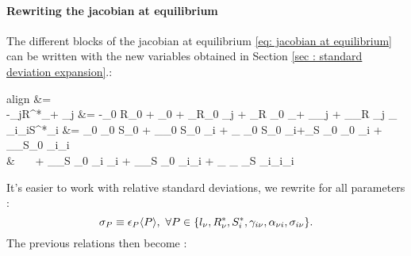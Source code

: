 \documentclass[12pt, titlepage, twoside, openright]{report}
\begin{document}
	 \paragraph{Rewriting the jacobian at equilibrium}
	 The different blocks of the jacobian at equilibrium \eqref{eq: jacobian at equilibrium} can be written with the new variables obtained in Section \ref{sec : standard deviation expansion}.:
	 \begin{empheq}[left=\empheqlbrace]{align}
	  &=  \\
	 -\gamma_{j\mu}R^*_\mu + \alpha_{\mu j} &= -\gamma_0 R_0 + \alpha_0 + \sigma_\gamma R_0 \tilde{\gamma}_{j\mu} + \sigma_R \gamma_0 _\mu + \sigma_\alpha \tilde{\alpha}_{\mu j} + \sigma_\gamma \sigma_R \tilde{\gamma}_{j\mu} _\mu \\
	 \sigma_{i\nu}\gamma_{i\nu}S^*_i &= \sigma_0 \gamma_0 S_0 + \sigma_\sigma \gamma_0 S_0 \tilde{\sigma}_{i\nu} + \sigma_{\gamma} \sigma_0 S_0 \tilde{\gamma}_{i\nu}+\sigma_S \sigma_0 \gamma_0 _i + \sigma_\sigma \sigma_\gamma S_0 \tilde{\sigma}_{i\nu}\tilde{\gamma}_{i\nu} \nonumber \\
	  & \ \ \ + \sigma_\sigma \sigma_S \gamma_0 \tilde{\sigma}_{i\nu} _i + \sigma_\gamma \sigma_S \sigma_0 \tilde{\gamma}_{i\nu}_i + \sigma_{\sigma} \sigma_{\gamma} \sigma_{S} \tilde{\sigma}_{i\nu}\tilde{\gamma}_{i\nu}_i
	 \end{empheq}
	 It's easier to work with relative standard deviations, \ie we rewrite for all parameters :
	 \begin{equation}
	 \sigma_P \equiv \epsilon_P \langle P \rangle, \ \forall P \in\{l_\nu, R^*_\nu, S^*_i, \gamma_{i\nu}, \alpha_{\nu i}, \sigma_{i\nu}\}.
	 \end{equation}
	 The previous relations then become :
\end{document}
